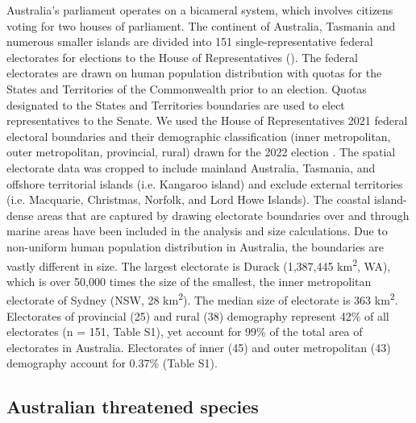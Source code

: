 \documentclass[a4paper,11pt]{article}
\begin{document}
Australia's parliament operates on a bicameral system, which involves citizens voting for two houses of parliament. The continent of Australia, Tasmania and numerous smaller islands are divided into 151 single-representative federal electorates for elections to the House of Representatives (\cite{parliamentofaustraliaElectoralDivisions2018}). The federal electorates are drawn on human population distribution with quotas for the States and Territories of the Commonwealth prior to an election. Quotas designated to the States and Territories boundaries are used to elect representatives to the Senate. We used the House of Representatives 2021 federal electoral boundaries and their demographic classification (inner metropolitan, outer metropolitan, provincial, rural) drawn for the 2022 election \cite{australiaelectoralcomissionFederalElectoralBoundaries2019}. The spatial electorate data was cropped to include mainland Australia, Tasmania, and offshore territorial islands (i.e. Kangaroo island) and exclude external territories (i.e. Macquarie, Christmas, Norfolk, and Lord Howe Islands). The coastal island-dense areas that are captured by drawing electorate boundaries over and through marine areas have been included in the analysis and size calculations. Due to non-uniform human population distribution in Australia, the boundaries are vastly different in size. The largest electorate is Durack (1,387,445 km\textsuperscript{2}, WA), which is over 50,000 times the size of the smallest, the inner metropolitan electorate of Sydney (NSW, 28 km\textsuperscript{2}). The median size of electorate is 363 km\textsuperscript{2}. Electorates of provincial (25) and rural (38) demography represent 42\% of all electorates (n = 151, Table S1), yet account for 99\% of the total area of electorates in Australia. Electorates of inner (45) and outer metropolitan (43) demography account for 0.37\% (Table S1).

\subsection{Australian threatened species}
\end{document}
